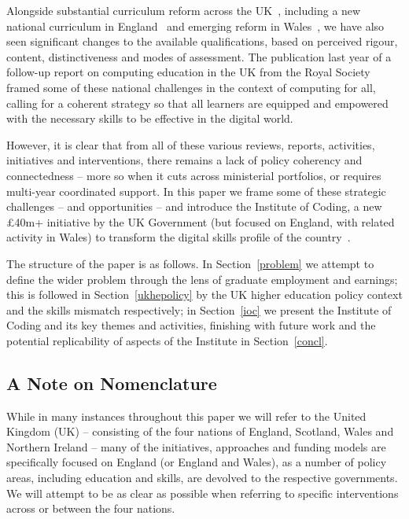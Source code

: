\documentclass[conference]{IEEEtran}
\begin{document}
Alongside substantial curriculum reform across the
UK~\cite{crick+sentance:2011,brown-et-al:sigcse2013,brown-et-al:toce2014},
including a new national curriculum in England~\cite{DfE2013a} and
emerging reform in
Wales~\cite{wgictreview:2013,crick+moller:wipsce2015,moller+crick:jce2018},
we have also seen significant changes to the available qualifications,
based on perceived rigour, content, distinctiveness and modes of
assessment. The publication last year of a follow-up report on
computing education in the UK from the Royal Society~\cite{rs:2017}
framed some of these national challenges in the context of computing
for all, calling for a coherent strategy so that all learners are
equipped and empowered with the necessary skills to be effective in
the digital world.

However, it is clear that from all of these various reviews, reports,
activities, initiatives and interventions, there remains a lack of
policy coherency and connectedness -- more so when it cuts across
ministerial portfolios, or requires multi-year coordinated support. In
this paper we frame some of these strategic challenges -- and
opportunities -- and introduce the Institute of Coding, a new
\pounds40m+ initiative by the UK Government (but focused on England,
with related activity in Wales) to transform the digital skills
profile of the country~\cite{davenport-et-al:cep2019}.

The structure of the paper is as follows. In Section~\ref{problem} we
attempt to define the wider problem through the lens of graduate
employment and earnings; this is followed in Section~\ref{ukhepolicy}
by the UK higher education policy context and the skills mismatch
respectively; in Section~\ref{ioc} we present the Institute of Coding
and its key themes and activities, finishing with future work and the
potential replicability of aspects of the Institute in
Section~\ref{concl}.


\subsection{A Note on Nomenclature}

While in many instances throughout this paper we will refer to the
United Kingdom (UK) -- consisting of the four nations of England,
Scotland, Wales and Northern Ireland -- many of the %
initiatives, approaches and funding models are specifically focused on
England (or England and Wales), as a number of policy areas,
including education and skills, are devolved to the respective
governments. We will attempt to be as clear as possible when referring
to specific interventions across or between the four nations.
\end{document}
